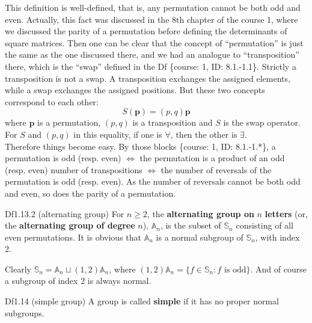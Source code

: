 \documentclass{article}
\begin{document}
\begin{Rmk}{}
    \textcolor{Th}{This definition is well-defined, that is, any permutation cannot be both odd and even.} Actually, this fact was discussed in the 8th chapter of the course 1, where we discussed the parity of a permutation before defining the determinants of square matrices. Then one can be clear that the concept of ``permutation'' is just the same as the one discussed there, and we had an analogue to ``transposition'' there, which is the ``swap'' defined in the Df \{course: 1, ID: 8.1.-1.1\}. Strictly a transposition is not a swap. A transposition exchanges the assigned elements, while a swap exchanges the assigned positions. But these two concepts correspond to each other:
    $$ S(\pmb{p}) = (p, q) \pmb{p} $$
    where $\pmb{p}$ is a permutation, $(p,q)$ is a transposition and $S$ is the swap operator. For $S$ and $(p,q)$ in this equality, if one is $\forall$, then the other is $\exists$. \\
    Therefore things become easy. By those blocks \{course: 1, ID: 8.1.-1.*\}, a permutation is odd (resp. even) $\Longleftrightarrow$ the permutation is a product of an odd (resp. even) number of transpositions $\Longleftrightarrow$ the number of reversals of the permutation is odd (resp. even). As the number of reversals cannot be both odd and even, so does the parity of a permutation. 
\end{Rmk}

\begin{Df}{Df1.13.2 (alternating group)}
    For $n\geq 2$, the \textbf{alternating group on} $n$ \textbf{letters} (or, the \textbf{alternating group of degree} $n$), $\mathbb{A}_n$, is the subset of $\mathbb{S}_n$ consisting of all even permutations. \textcolor{Th}{It is obvious that $\mathbb{A}_n$ is a normal subgroup of $\mathbb{S}_n$, with index 2.} 
\end{Df}

\begin{Rmk}{}
    Clearly \textcolor{Th}{$\mathbb{S}_n = \mathbb{A}_n\sqcup (1,2)\mathbb{A}_n$, where $(1,2)\mathbb{A}_n = \{f\in\mathbb{S}_n: f \text{ is odd}\}$}. And of course \textcolor{Th}{a subgroup of index 2 is always normal}. 
\end{Rmk}

\begin{Df}{Df1.14 (simple group)}
    A group is called \textbf{simple} if it has no proper normal subgroups.
\end{Df}
\end{document}
